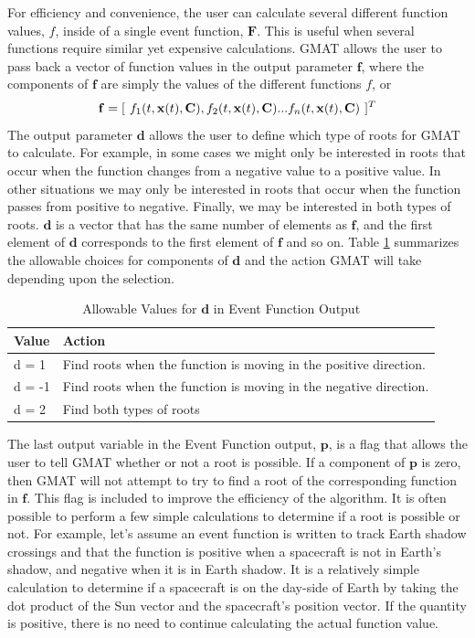 For efficiency and convenience, the user can calculate several
different function values, $f$, inside of a single event function,
$\mathbf{F}$. This is useful when several functions require similar
yet expensive calculations.  GMAT allows the user to pass back a
vector of function values in the output parameter $\mathbf{f}$,
where the components of $\mathbf{f}$ are simply the values of the
different functions $f$, or
%
\begin{equation}
     \mathbf{f} = [ \hspace{.05 in} f_1(t, \mathbf{x}(t),\mathbf{C}),  f_2(t,
     \mathbf{x}(t),\mathbf{C}) ... f_n(t,
     \mathbf{x}(t),\mathbf{C})\hspace{.05 in}]^T
\end{equation}
%
 The output parameter $\mathbf{d}$ allows
the user to define which type of roots for GMAT to calculate. For
example, in some cases  we might only be interested in roots that
occur when the function changes from a negative value to a positive
value. In other situations we may only be interested in roots that
occur when the function passes from positive to negative. Finally,
we may be interested in both types of roots.  $\mathbf{d}$ is a
vector that has the same number of elements as $\mathbf{f}$, and the
first element  of $\mathbf{d}$ corresponds to the first element of
$\mathbf{f}$ and so on. Table \ref{Table:EventFunction_dValues}
summarizes the allowable choices for components of $\mathbf{d}$ and
the action GMAT will take depending upon the selection.
%
\begin{table}[htb]
\caption{ Allowable Values for $\mathbf{d}$ in Event Function
Output}
\begin{tabular}{p{.5 in} p{2.5 in}}
   \hline
   Value & Action\\
   \hline \hline
     d = 1 & Find roots when the function is moving  in the positive
    direction. \\
    d = -1 & Find roots when the function is moving in the
        negative
    direction. \\
   d = 2 & Find both types of roots\\
   \hline
 \end{tabular}
 \label{Table:EventFunction_dValues}
\end{table}

The last output variable in the Event Function output, $\mathbf{p}$,
is a flag that allows the user to tell GMAT whether or not a root is
possible.  If a component of $\mathbf{p}$ is zero, then GMAT will
not attempt to try to find a root of the corresponding function in
$\mathbf{f}$.  This flag is included to improve the efficiency of
the algorithm. It is often possible to perform a few simple
calculations to determine if a root is possible or not. For example,
let's assume an event function is written to track Earth shadow
crossings and that the function is positive when a spacecraft is not
in Earth's shadow, and negative when it is in Earth shadow.  It is a
relatively simple calculation to determine if a spacecraft is on the
day-side of Earth by taking the dot product of the Sun vector and
the spacecraft's position vector. If the quantity is positive, there
is no need to continue calculating the actual function value.

